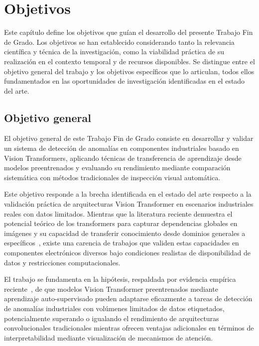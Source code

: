 \chapter{Objetivos}
\label{ch:objetivos}

Este capítulo define los objetivos que guían el desarrollo del presente Trabajo Fin de Grado. Los objetivos se han establecido considerando tanto la relevancia científica y técnica de la investigación, como la viabilidad práctica de su realización en el contexto temporal y de recursos disponibles. Se distingue entre el objetivo general del trabajo y los objetivos específicos que lo articulan, todos ellos fundamentados en las oportunidades de investigación identificadas en el estado del arte.

\section{Objetivo general}

El objetivo general de este Trabajo Fin de Grado consiste en desarrollar y validar un sistema de detección de anomalías en componentes industriales basado en Vision Transformers, aplicando técnicas de transferencia de aprendizaje desde modelos preentrenados y evaluando su rendimiento mediante comparación sistemática con métodos tradicionales de inspección visual automática.

Este objetivo responde a la brecha identificada en el estado del arte respecto a la validación práctica de arquitecturas Vision Transformer en escenarios industriales reales con datos limitados. Mientras que la literatura reciente demuestra el potencial teórico de los transformers para capturar dependencias globales en imágenes y su capacidad de transferir conocimiento desde dominios generales a específicos~\cite{huang2025semiconductor,zhang2025exploring}, existe una carencia de trabajos que validen estas capacidades en componentes electrónicos diversos bajo condiciones realistas de disponibilidad de datos y restricciones computacionales.

El trabajo se fundamenta en la hipótesis, respaldada por evidencia empírica reciente~\cite{huang2025semiconductor}, de que modelos Vision Transformer preentrenados mediante aprendizaje auto-supervisado pueden adaptarse eficazmente a tareas de detección de anomalías industriales con volúmenes limitados de datos etiquetados, potencialmente superando o igualando el rendimiento de arquitecturas convolucionales tradicionales mientras ofrecen ventajas adicionales en términos de interpretabilidad mediante visualización de mecanismos de atención.


